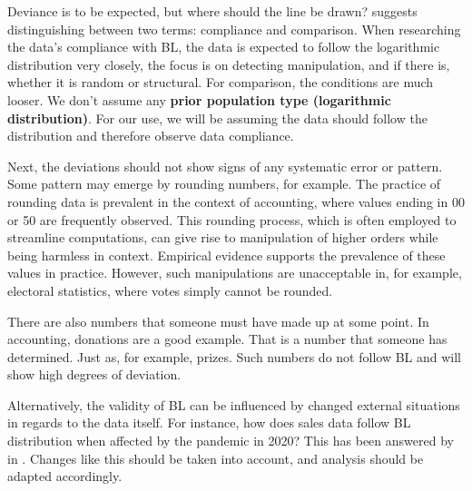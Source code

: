 

Deviance is to be expected, but where should the line be drawn?  \citeauthor{kossovsky2014benford} suggests distinguishing between two terms: compliance and comparison. When researching the data's compliance with BL, the data is expected to follow the logarithmic distribution very closely, the focus is on detecting manipulation, and if there is, whether it is random or structural. For comparison, the conditions are much looser. We don't assume any \textbf{prior population type (logarithmic distribution)}. For our use, we will be assuming the data should follow the distribution and therefore observe data compliance.


Next, the deviations should not show signs of any systematic error or pattern. Some pattern may emerge by rounding numbers, for example. The practice of rounding data is prevalent in the context of accounting, where values ending in 00 or 50 are frequently observed. This rounding process, which is often employed to streamline computations, can give rise to manipulation of higher orders while being harmless in context. Empirical evidence supports the prevalence of these values in practice. %
However, such manipulations are unacceptable in, for example, electoral statistics, where votes simply cannot be rounded.
\cite{kossovsky2014benford}


There are also numbers that someone must have made up at some point. In accounting, donations are a good example. That is a number that someone has determined. Just as, for example, prizes. Such numbers do not follow BL and will show high degrees of deviation. \cite{kossovsky2014benford}

Alternatively, the validity of BL can be influenced by changed external situations in regards to the data itself. For instance, how does sales data follow BL distribution when affected by the pandemic in 2020? This has been answered by \citeauthor{Hronova2023} in \citeyear{Hronova2023}. Changes like this should be taken into account, and analysis should be adapted accordingly.


